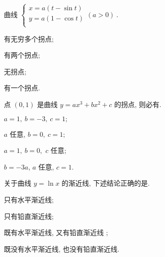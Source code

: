 \begin{problem}
曲线 $\left\{ \begin{matrix}
 x = a(t - \sin t) \\
 y = a(1 - \cos t) \\
\end{matrix}(a > 0) \right.\ $.

\begin{abcd} \item 有无穷多个拐点;

\item 有两个拐点;

\item 无拐点;

\item 有一个拐点.

\end{abcd}

\end{problem}


\begin{problem} 
点 $(0,1)$ 是曲线 $y = ax^{3} + bx^{2} + c$ 的拐点, 则必有.

\begin{abcd} \item $a = 1,\ b = - 3,\ c = 1;$

\item $a$ 任意, $b = 0,\ c = 1;$

\item $a = 1,\ b = 0,$ $c$ 任意;

\item $b = - 3a$, $a$ 任意, $c = 1$.

\end{abcd}

\end{problem}

\begin{problem}
关于曲线 $y = \ln x$ 的渐近线, 下述结论正确的是.

\begin{abcd} \item 只有水平渐近线;

\item 只有铅直渐近线;

\item 既有水平渐近线, 又有铅直渐近线 ;

\item 既没有水平渐近线, 也没有铅直渐近线.

\end{abcd}

\end{problem}

